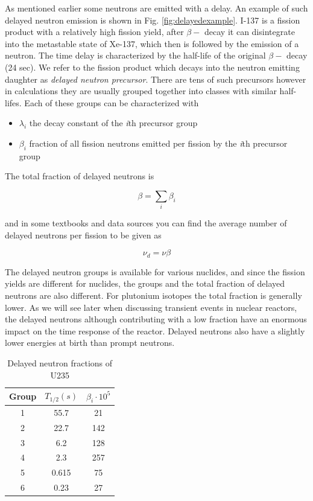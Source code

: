 As mentioned earlier some neutrons are emitted with a delay. An example of such delayed neutron emission is shown in Fig. \ref{fig:delayedexample}. I-137 is a fission product with a relatively high fission yield, after $\beta -$ decay it can disintegrate into the metastable state of Xe-137, which then is followed by the emission of a neutron. The time delay is characterized by the half-life of the original $\beta -$ decay (24 sec). We refer to the fission product which decays into the neutron emitting daughter as \textit{delayed neutron precursor}. There are tens of such precursors however in calculations they are usually grouped together into classes with similar half-lifes. Each of these groups can be characterized with

\begin{itemize}
\item $\lambda_i$ the decay constant of the \textit{i}th precursor group
\item $\beta_i$ fraction of all fission neutrons emitted per fission by the \textit{i}th precursor group
\end{itemize} 

The total fraction of delayed neutrons is

\[
\beta=\sum_i \beta_i
\]

and in some textbooks and data sources you can find the average number of delayed neutrons per fission to be given as

\[
\nu_d=\nu\beta
\]


The delayed neutron groups is available for various nuclides, and since the fission yields are different for nuclides, the groups and the total fraction of delayed neutrons are also different. For plutonium isotopes the total fraction is generally lower. As we will see later when discussing transient events in nuclear reactors, the delayed neutrons although contributing with a low fraction have an enormous impact on the time response of the reactor. Delayed neutrons also have a slightly lower energies at birth than prompt neutrons. 

\begin{table}\caption{Delayed neutron fractions of U235}
\centering\begin{tabular}{c | c | c}
Group & $T_{1/2} (s)$ & $\beta_i\cdot 10^5$ \\
\hline
1 & 55.7 & 21 \\
2 & 22.7 & 142 \\
3 & 6.2 & 128 \\
4 & 2.3 & 257 \\
5 & 0.615 & 75 \\
6 & 0.23 & 27 
\end{tabular}
\end{table}

